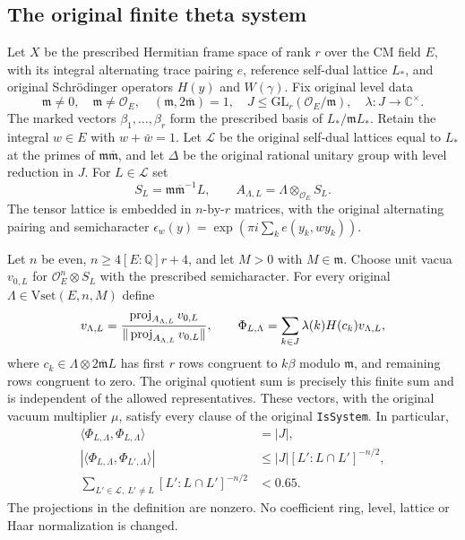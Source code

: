 \subsection{The original finite theta system}
\label{actual-finite-theta-system}

Let $X$ be the prescribed Hermitian frame space of rank $r$ over
the CM field $E$, with its integral alternating trace pairing $e$,
reference self-dual lattice $L_*$, and original Schr\"odinger
operators $H(y)$ and $W(\gamma)$. Fix original level data
\[
 \mathfrak m\ne0,\quad\mathfrak m\ne\mathcal O_E,
 \quad(\mathfrak m,2\overline{\mathfrak m})=1,
 \quad J\le\mathrm{GL}_r(\mathcal O_E/\mathfrak m),
 \quad\lambda:J\longrightarrow\mathbb C^\times.
\]
The marked vectors $\beta_1,\ldots,\beta_r$ form the prescribed
basis of $L_*/\mathfrak mL_*$. Retain the integral $w\in E$ with
$w+\bar w=1$. Let $\mathcal L$ be the original self-dual lattices
equal to $L_*$ at the primes of $\mathfrak m\overline{\mathfrak m}$,
and let $\Delta$ be the original rational unitary group with level
reduction in $J$. For $L\in\mathcal L$ set
\[
 S_L=\mathfrak m\overline{\mathfrak m}^{-1}L,
 \qquad A_{\Lambda,L}=\Lambda\otimes_{\mathcal O_E}S_L.
\]
The tensor lattice is embedded in $n$-by-$r$ matrices, with the
original alternating pairing and semicharacter
$\epsilon_w(y)=\exp(\pi i\sum_k e(y_k,wy_k))$.

\begin{theorem}\label{actual-finite-theta-system-theorem}
Let $n$ be even, $n\ge4[E:\mathbb Q]r+4$, and let $M>0$ with
$M\in\mathfrak m$. Choose unit vacua $v_{0,L}$ for
$\mathcal O_E^n\otimes S_L$ with the prescribed semicharacter.
For every original $\Lambda\in\mathrm{Vset}(E,n,M)$ define
\[
 v_{\Lambda,L}
  ={\operatorname{proj}_{A_{\Lambda,L}}v_{0,L}
       \over\|\operatorname{proj}_{A_{\Lambda,L}}v_{0,L}\|},
 \qquad
 \Phi_{L,\Lambda}=\sum_{k\in J}\lambda(k)H(c_k)v_{\Lambda,L},
\]
where $c_k\in\Lambda\otimes2\overline{\mathfrak m}L$ has first
$r$ rows congruent to $k\beta$ modulo $\mathfrak m$, and remaining
rows congruent to zero. The original quotient sum is precisely this
finite sum and is independent of the allowed representatives.
These vectors, with the original vacuum multiplier $\mu$, satisfy
every clause of the original \texttt{IsSystem}. In particular,
\begin{align}
 \langle\Phi_{L,\Lambda},\Phi_{L,\Lambda}\rangle&=|J|,
                                                        \label{finite-system-norm}\\
 |\langle\Phi_{L,\Lambda},\Phi_{L',\Lambda}\rangle|
   &\le |J|[L':L\cap L']^{-n/2},                         \label{finite-system-overlap}\\
 \sum_{L'\in\mathcal L,\ L'\ne L}
       [L':L\cap L']^{-n/2}&<0.65.                      \label{finite-system-tail}
\end{align}
The projections in the definition are nonzero. No coefficient
ring, level, lattice or Haar normalization is changed.
\end{theorem}

